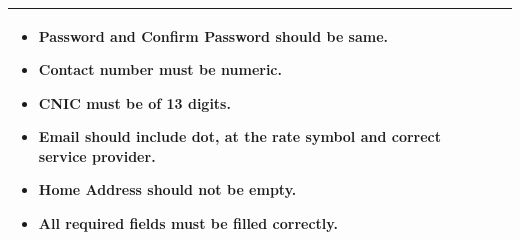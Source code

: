 \documentclass[12pt,a4paper]{article}
\begin{document}
\begin{longtable}{| p{3cm}|p{12cm}|}
\begin{itemize}
\item  Password and Confirm Password should be same.
\item  Contact number must be numeric. 
\item  CNIC must be of 13 digits.
\item  Email should include dot, at the rate symbol and correct service provider.
\item Home Address should not be empty. 
\item All required fields must be filled correctly. 
\end{itemize}
\\ \hline

\end{longtable} 
\end{document}

